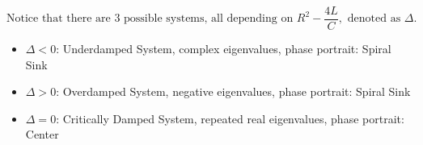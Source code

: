 \documentclass[preview]{standalone}
\begin{document}
\begin{center}
\[\text{Notice that there are 3 possible systems, all depending on } 
                    R^2 - \frac{4L}{C}, \text{ denoted as } \Delta.\]
                    \begin{itemize}
                        \item $\Delta < 0$: Underdamped System, complex eigenvalues, phase portrait: Spiral Sink
                        \item $\Delta > 0$: Overdamped System, negative eigenvalues, phase portrait: Spiral Sink
                        \item $\Delta = 0$: Critically Damped System, repeated real eigenvalues, phase portrait: Center
                    \end{itemize}
\end{center}
\end{document}
